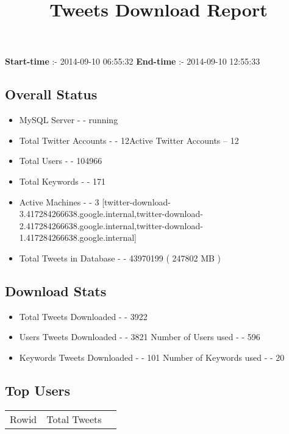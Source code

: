 \documentclass{article}\usepackage[T1]{fontenc}
\begin{document}
\title{\textbf{Tweets Download Report}}
               \date{}
                \maketitle
               \centerline{\textbf{Start-time} :- 2014-09-10 06:55:32 \hspace{40pt} \textbf{End-time} :- 2014-09-10 12:55:33}               \subsection*{Overall Status}                \begin{itemize}                \item MySQL Server - - running               \item Total Twitter Accounts - - 12\newline Active Twitter Accounts -- 12               \item Total Users - - 104966               \item Total Keywords - - 171               \item Active Machines - - 3 [twitter-download-3.417284266638.google.internal,twitter-download-2.417284266638.google.internal,twitter-download-1.417284266638.google.internal]               \item Total Tweets in Database - - 43970199 ( 247802 MB )               \end{itemize}               \subsection*{Download Stats}                \begin{itemize}                \item Total Tweets Downloaded - - 3922               \item Users Tweets Downloaded - - 3821 \newline Number of Users used - - 596               \item Keywords Tweets Downloaded - - 101 \newline Number of Keywords used - - 20              \end{itemize}              \subsection*{Top Users}\begin{tabular}{|c|c|c|}         \hline         Rowid & Total Tweets \\ 

\end{tabular}
\end{document}
